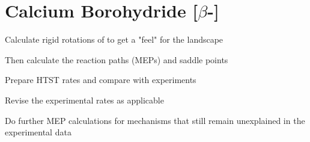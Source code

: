 \section{Calcium Borohydride [$\beta$-]}
\label{sec:borohydrides-calcium}

\bit
\item Calculate rigid rotations of  to get a "feel" for the landscape
\item Then calculate the reaction paths (MEPs) and saddle points
\item Prepare HTST rates and compare with experiments
\item Revise the experimental rates as applicable
\item Do further MEP calculations for mechanisms that still remain unexplained in the experimental data
\eit

\placeholder
